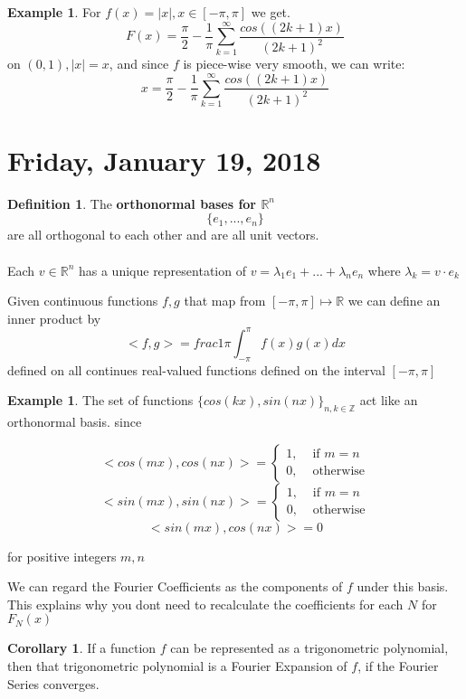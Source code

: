 \documentclass[12pt]{article}
\theoremstyle{plain}
\theoremstyle{definition}
\newtheorem{definition}[theorem]{Definition}
\newtheorem{example}[theorem]{Example}
\newtheorem{corollary}[theorem]{Corollary}
\begin{document}
\begin{example}
	For $f(x)=|x|, x\in [-\pi,\pi]$ we get.
	$$F(x) = \frac{\pi}{2} - \frac{1}{\pi}\sum^\infty_{k=1} \frac{cos((2k+1)x)}{(2k+1)^2}$$
	on $(0,1), |x|=x$, and since $f$ is piece-wise very smooth, we can write:
	$$x=\frac{\pi}{2} - \frac{1}{\pi}\sum^\infty_{k=1} \frac{cos((2k+1)x)}{(2k+1)^2}$$
\end{example}

\section{Friday, January 19, 2018}

\begin{definition}
	The \textbf{orthonormal bases for $\mathbb{R}^n$}
	$$\{ e_1, ..., e_n \}$$
	are all orthogonal to each other and are all unit vectors.\\
	\\
	Each $v\in \mathbb{R}^n$ has a unique representation of
	$v = \lambda_1 e_1 + ... + \lambda_n e_n$ where $\lambda_k = v \cdot e_k$
\end{definition}

Given continuous functions $f,g$ that map from $[-\pi, \pi] \mapsto \mathbb{R}$ we can define an inner product by
$$<f,g> = frac{1}{\pi} \int^{\pi}_{-\pi} f(x) g(x) dx$$ defined on all continues real-valued functions defined on the interval $[-\pi, \pi] $

\begin{example}
	The set of functions $\{ cos(kx), sin(nx) \}_{n,k\in\mathbb{Z}}$ act like an orthonormal basis. since

	$$<cos(mx), cos(nx)> = \begin{cases}1, &\text{ if } m=n\\ 0, &\text{ otherwise} \end{cases}$$
	$$<sin(mx), sin(nx)> = \begin{cases}1, &\text{ if } m=n\\ 0, &\text{ otherwise} \end{cases}$$
	$$<sin(mx), cos(nx)> = 0$$

	for positive integers $m,n$
\end{example}

We can regard the Fourier Coefficients as the components of $f$ under this basis. This explains why you dont need to recalculate the coefficients for each $N$ for $F_N (x)$

\begin{corollary}
	If a function $f$ can be represented as a trigonometric polynomial, then that trigonometric polynomial is a Fourier Expansion of $f$, if the Fourier Series converges.
\end{corollary}
\end{document}
